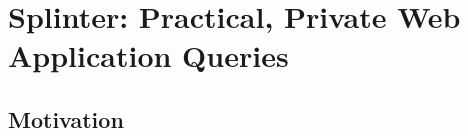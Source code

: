 \section{Splinter: Practical, Private Web Application Queries}
\label{chap:splinter}

\subsection{Motivation}